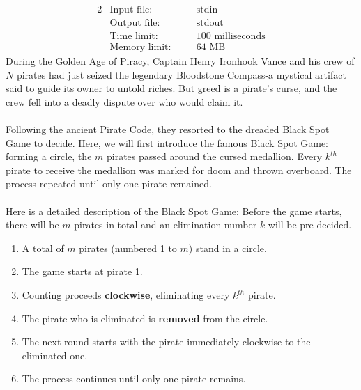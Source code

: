 \documentclass[12pt,a4paper]{article}
\begin{document}
\begin{alignat*} {2}
 &   \text{Input file:}   \quad     &&\text{stdin}\\
 &   \text{Output file:}  \quad     &&\text{stdout}\\
 &   \text{Time limit:}   \quad     &&\text{100 milliseconds}\\
 &   \text{Memory limit:} \quad     &&\text{64 MB}
\end{alignat*}
\noindent
During the Golden Age of Piracy, Captain Henry Ironhook Vance and his crew of \(N\) pirates had just seized the legendary Bloodstone Compass-a mystical artifact said to guide its owner to untold riches. 
But greed is a pirate's curse, and the crew fell into a deadly dispute over who would claim it.\\
\noindent\\
Following the ancient Pirate Code, they resorted to the dreaded Black Spot Game to decide. 
Here, we will first introduce the famous Black Spot Game: forming a circle, the \(m\) pirates passed around the cursed medallion. 
Every \(k^{th}\) pirate to receive the medallion was marked for doom and thrown overboard. 
The process repeated until only one pirate remained.\\
\noindent\\
Here is a detailed description of the Black Spot Game:
Before the game starts, there will be \(m\) pirates in total and an elimination number \(k\) will be pre-decided.
\begin{enumerate}
    \setlength{\itemsep}{-3pt} %
    \item A total of \(m\) pirates (numbered 1 to \(m\)) stand in a circle.
    \item The game starts at pirate 1.
    \item Counting proceeds \textbf{clockwise}, eliminating every \(k^{th}\) pirate.
    \item The pirate who is eliminated is \textbf{removed} from the circle.
    \item The next round starts with the pirate immediately clockwise to the eliminated one.
    \item The process continues until only one pirate remains.
\end{enumerate}
\end{document}
